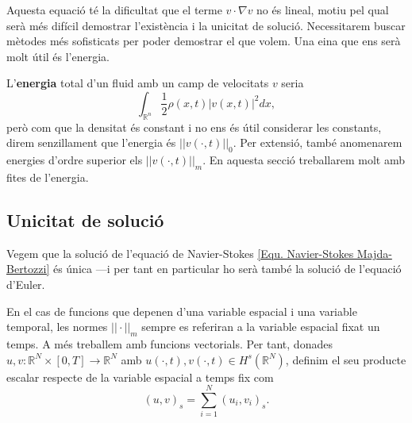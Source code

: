 \documentclass{article}
\numberwithin{equation}{section}
\begin{document}
Aquesta equaci\'{o} t\'{e} la dificultat que el terme $v\cdot\nabla v$ no \'{e}s lineal, motiu pel qual ser\`{a} m\'{e}s dif\'{i}cil demostrar l'exist\`{e}ncia i la unicitat de soluci\'{o}. Necessitarem buscar m\`{e}todes m\'{e}s sofisticats per poder demostrar el que volem. Una eina que ens ser\`{a} molt \'{u}til \'{e}s l'energia.

L'\textbf{energia} total d'un fluid amb un camp de velocitats $v$ seria
\[\int_{\mathbb{R}^n}\frac{1}{2}\rho(x,t)|v(x,t)|^2dx,\]
per\`{o} com que la densitat \'{e}s constant i no ens \'{e}s \'{u}til considerar les constants, direm senzillament que l'energia \'{e}s $||v(\cdot,t)||_0$. Per extensi\'{o}, tamb\'{e} anomenarem energies d'ordre superior els $||v(\cdot,t)||_m$. En aquesta secci\'{o} treballarem molt amb fites de l'energia.

\subsection{Unicitat de soluci\'{o}}

Vegem que la soluci\'{o} de l'equaci\'{o} de Navier-Stokes \eqref{Equ. Navier-Stokes Majda-Bertozzi} \'{e}s \'{u}nica ---i per tant en particular ho ser\`{a} tamb\'{e} la soluci\'{o} de l'equaci\'{o} d'Euler.

En el cas de funcions que depenen d'una variable espacial i una variable temporal, les normes $||\cdot||_m$ sempre es referiran a la variable espacial fixat un temps. A m\'{e}s treballem amb funcions vectorials. Per tant, donades $u,v:\mathbb{R}^N\times[0,T]\rightarrow\mathbb{R}^N$ amb $u(\cdot,t),v(\cdot,t)\in H^s(\mathbb{R}^N)$, definim el seu producte escalar respecte de la variable espacial a temps fix com
\[(u,v)_s=\sum_{i=1}^N(u_i,v_i)_s.\]
\end{document}
